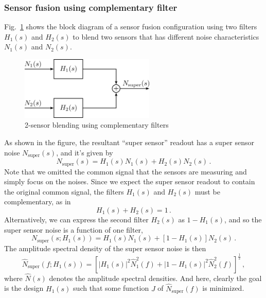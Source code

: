 \subsubsection{Sensor fusion using complementary filter \label{sec:complementary_filter}}
Fig.~\ref{fig:complementary_filter} shows the block diagram of a sensor fusion configuration using two filters $H_1(s)$ and $H_2(s)$ to blend two sensors that has different noise characteristics $N_1(s)$ and $N_2(s)$. 
\begin{figure}[!h]
	\centering
	\includegraphics[width=64mm]{figures/complementary_filter}
	\caption{2-sensor blending using complementary filters}
	\label{fig:complementary_filter}
\end{figure}
As shown in the figure, the resultant ``super sensor'' readout has a super sensor noise $N_\mathrm{super}(s)$, and it's given by
\begin{equation}
	N_\mathrm{super}(s) = H_1(s)N_1(s) + H_2(s)N_2(s)\,.
\end{equation}
Note that we omitted the common signal that the sensors are measuring and simply focus on the noises.
Since we expect the super sensor readout to contain the original common signal, the  filters $H_1(s)$ and $H_2(s)$ must be complementary, as in
\begin{equation}
	H_1(s) + H_2(s) = 1\,.
\end{equation}
Alternatively, we can express the second filter $H_2(s)$ as $1-H_1(s)$, and so the super sensor noise is a function of one filter,
\begin{equation}
	N_\mathrm{super}(s; H_1(s)) = H_1(s)N_1(s) + \left[1-H_1(s)\right]N_2(s)\,.
\end{equation}
The amplitude spectral density of the super sensor noise is then
\begin{equation}
	\hat{N}_\mathrm{super}(f; H_1(s)) = \left[\left\lvert H_1(s) \right\rvert^2\hat{N}_1^2(f) + \left\lvert 1-H_1(s) \right\rvert^2\hat{N}_2^2(f)\right]^\frac{1}{2}\,,
\end{equation}
where $\hat{N}(s)$ denotes the amplitude spectral densities.
And here, clearly the goal is the design $H_1(s)$ such that some function $J$ of $\hat{N}_\mathrm{super}(f)$ is minimized.
